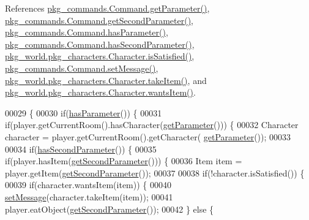 References \hyperlink{Command_8java_source_l00041}{pkg\-\_\-commands.\-Command.\-get\-Parameter()}, \hyperlink{Command_8java_source_l00049}{pkg\-\_\-commands.\-Command.\-get\-Second\-Parameter()}, \hyperlink{Command_8java_source_l00073}{pkg\-\_\-commands.\-Command.\-has\-Parameter()}, \hyperlink{Command_8java_source_l00081}{pkg\-\_\-commands.\-Command.\-has\-Second\-Parameter()}, \hyperlink{Character_8java_source_l00136}{pkg\-\_\-world.\-pkg\-\_\-characters.\-Character.\-is\-Satisfied()}, \hyperlink{Command_8java_source_l00089}{pkg\-\_\-commands.\-Command.\-set\-Message()}, \hyperlink{Character_8java_source_l00113}{pkg\-\_\-world.\-pkg\-\_\-characters.\-Character.\-take\-Item()}, and \hyperlink{Character_8java_source_l00124}{pkg\-\_\-world.\-pkg\-\_\-characters.\-Character.\-wants\-Item()}.


\begin{DoxyCode}
00029                                                                                                            
                              \{
00030         \textcolor{keywordflow}{if}(\hyperlink{classpkg__commands_1_1Command_a02af95ab3f1898a66259ab7c177b6998}{hasParameter}()) \{
00031             \textcolor{keywordflow}{if}(player.getCurrentRoom().hasCharacter(\hyperlink{classpkg__commands_1_1Command_a41c92d445be73ea9d62320c65efb8434}{getParameter}())) \{
00032                 Character character = player.getCurrentRoom().getCharacter(
      \hyperlink{classpkg__commands_1_1Command_a41c92d445be73ea9d62320c65efb8434}{getParameter}());
00033 
00034                 \textcolor{keywordflow}{if}(\hyperlink{classpkg__commands_1_1Command_add688a76d80576c34f23927da19b9e2d}{hasSecondParameter}()) \{
00035                     \textcolor{keywordflow}{if}(player.hasItem(\hyperlink{classpkg__commands_1_1Command_a20d3ebdc0683a87b43be2a92a1cad111}{getSecondParameter}())) \{
00036                         Item item = player.getItem(\hyperlink{classpkg__commands_1_1Command_a20d3ebdc0683a87b43be2a92a1cad111}{getSecondParameter}());
00037 
00038                         \textcolor{keywordflow}{if}(!character.isSatisfied()) \{
00039                             \textcolor{keywordflow}{if}(character.wantsItem(item)) \{
00040                                 \hyperlink{classpkg__commands_1_1Command_ae210ff216fe908b111ba1c988a963d13}{setMessage}(character.takeItem(item));
00041                                 player.eatObject(\hyperlink{classpkg__commands_1_1Command_a20d3ebdc0683a87b43be2a92a1cad111}{getSecondParameter}());
00042                             \} \textcolor{keywordflow}{else} \{

\end{DoxyCode}
